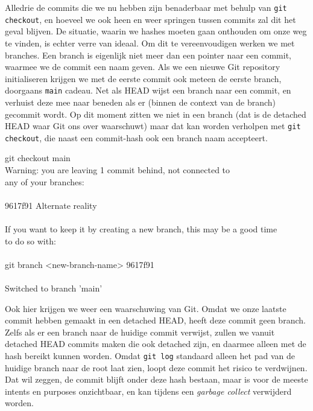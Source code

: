 Alledrie de commits die we nu hebben zijn benaderbaar met behulp van \texttt{git checkout}, en hoeveel we ook heen en weer springen tussen commits zal dit het geval blijven. De situatie, waarin we hashes moeten gaan onthouden om onze weg te vinden, is echter verre van ideaal. Om dit te vereenvoudigen werken we met branches. Een branch is eigenlijk niet meer dan een pointer naar een commit, waarmee we de commit een naam geven. Als we een nieuwe Git repository initialiseren krijgen we met de eerste commit ook meteen de eerste branch, doorgaans \texttt{main} cadeau. Net als HEAD wijst een branch naar een commit, en verhuist deze mee naar beneden als er (binnen de context van de branch) gecommit wordt. Op dit moment zitten we niet in een branch (dat is de detached HEAD waar Git ons over waarschuwt) maar dat kan worden verholpen met \texttt{git checkout}, die naast een commit-hash ook een branch naam accepteert. 

\begin{bash}
 git checkout main\\
Warning: you are leaving 1 commit behind, not connected to \\
any of your branches: \\
 ~ \\
  9617f91 Alternate reality \\
 ~ \\
If you want to keep it by creating a new branch, this may be a good time \\
to do so with: \\
 ~ \\
 git branch <new-branch-name> 9617f91 \\
 ~ \\
Switched to branch 'main' \\
\end{bash}

Ook hier krijgen we weer een waarschuwing van Git. Omdat we onze laatste commit hebben gemaakt in een detached HEAD, heeft deze commit geen branch. Zelfs als er een branch naar de huidige commit verwijst, zullen we vanuit detached HEAD commits maken die ook detached zijn, en daarmee alleen met de hash bereikt kunnen worden. Omdat \texttt{git log} standaard alleen het pad van de huidige branch naar de root laat zien, loopt deze commit het risico te verdwijnen. Dat wil zeggen, de commit blijft onder deze hash bestaan, maar is voor de meeste intents en purposes onzichtbaar, en kan tijdens een \emph{garbage collect} verwijderd worden.

